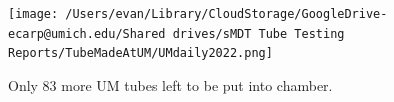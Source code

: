 \documentclass{beamer}
\begin{document}
		\begin{frame}
			\begin{figure}
				\texttt{[image: /Users/evan/Library/CloudStorage/GoogleDrive-ecarp@umich.edu/Shared drives/sMDT Tube Testing Reports/TubeMadeAtUM/UMdaily2022.png]}
				\caption*{Only 83 more UM tubes left to be put into chamber.}
			\end{figure}
		\end{frame}
\end{document}
